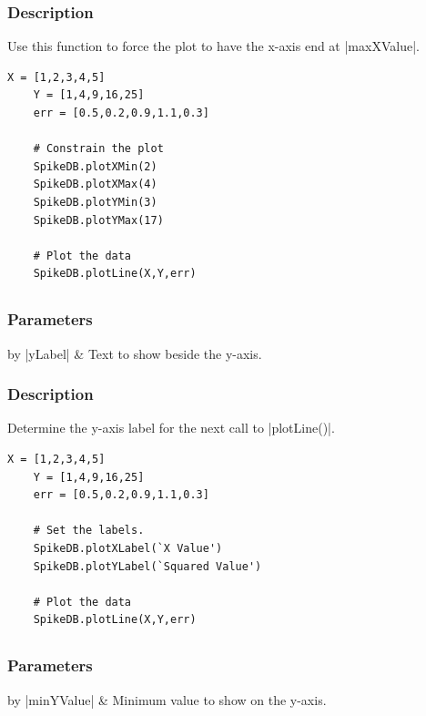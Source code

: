 \documentclass{report}
\begin{document}
\subsubsection{Description}
Use this function to force the plot to have the x-axis end at |maxXValue|.
\begin{lstlisting}[caption=Example]
	X = [1,2,3,4,5]
	Y = [1,4,9,16,25]
	err = [0.5,0.2,0.9,1.1,0.3]

	# Constrain the plot
	SpikeDB.plotXMin(2)
	SpikeDB.plotXMax(4)
	SpikeDB.plotYMin(3)
	SpikeDB.plotYMax(17)

	# Plot the data
	SpikeDB.plotLine(X,Y,err)
\end{lstlisting}


\clearpage
\subsection{}
\subsubsection{Parameters}
\begin{table}[h]
\begin{center}
\begin{tabular}{by}
		|yLabel| & Text to show beside the y-axis. \\
	\end{tabular}
\end{center}
\end{table}
\subsubsection{Description}
Determine the y-axis label for the next call to |plotLine()|.
\begin{lstlisting}[caption=Example]
	X = [1,2,3,4,5]
	Y = [1,4,9,16,25]
	err = [0.5,0.2,0.9,1.1,0.3]

	# Set the labels.
	SpikeDB.plotXLabel(`X Value')
	SpikeDB.plotYLabel(`Squared Value')

	# Plot the data
	SpikeDB.plotLine(X,Y,err)
\end{lstlisting}


\clearpage
\subsection{}
\subsubsection{Parameters}
\begin{table}[h]
\begin{center}
\begin{tabular}{by}
		|minYValue| & Minimum value to show on the y-axis.\\
	\end{tabular}
\end{center}
\end{table}
\end{document}
